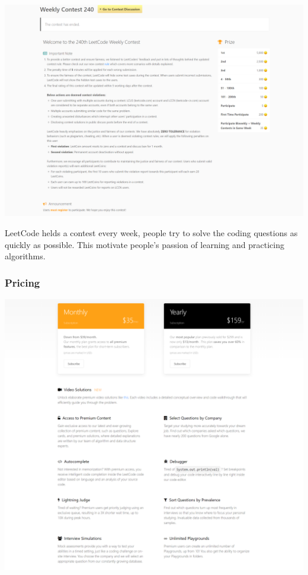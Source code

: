 \documentclass[a4paper]{report}
\begin{document}
\includegraphics[width=\linewidth]{Contest-LeetCode}

LeetCode helds a contest every week, people try to solve the coding questions as quickly as possible. This motivate people's passion of learning and practicing algorithms.

\subsubsection{Pricing}

\includegraphics[width=\linewidth]{LeetCode-Premium}
\end{document}
